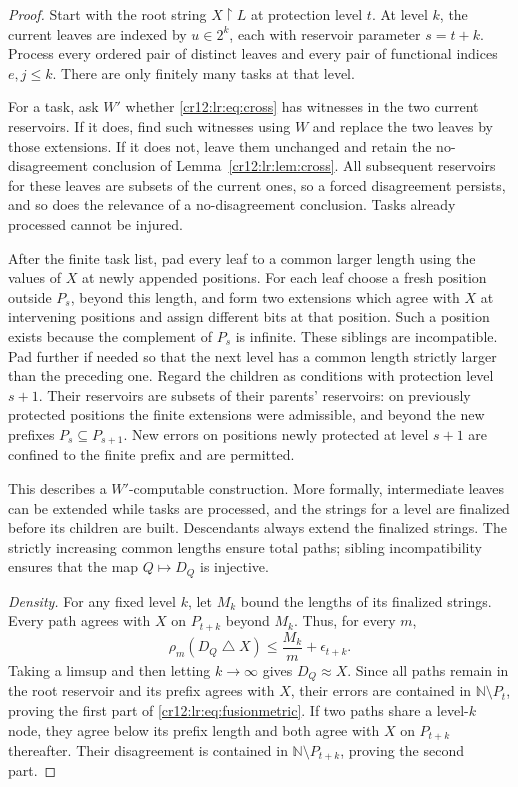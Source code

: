 \documentclass[11pt,letterpaper]{article}
\theoremstyle{plain}
\theoremstyle{definition}
\theoremstyle{remark}
\numberwithin{equation}{section}
\newcommand{\N}{\mathbb N}
\newcommand{\sd}{\mathbin{\triangle}}
\newcommand{\rest}{\mathbin{\upharpoonright}}
\begin{document}
\begin{proof}
Start with the root string $X\rest L$ at protection level $t$. At level $k$, the
current leaves are indexed by $u\in2^k$, each with reservoir parameter $s=t+k$.
Process every ordered pair of distinct leaves and every pair of functional indices
$e,j\leq k$. There are only finitely many tasks at that level.

For a task, ask $W'$ whether \eqref{cr12:lr:eq:cross} has witnesses in the two current
reservoirs. If it does, find such witnesses using $W$ and replace the two leaves by
those extensions. If it does not, leave them unchanged and retain the no-disagreement
conclusion of Lemma~\ref{cr12:lr:lem:cross}. All subsequent reservoirs for these
leaves are subsets of the current ones, so a forced disagreement persists, and so does
the relevance of a no-disagreement conclusion. Tasks already processed cannot be
injured.

After the finite task list, pad every leaf to a common larger length using the values
of $X$ at newly appended positions. For each leaf choose a fresh position outside
$P_s$, beyond this length, and form two extensions which agree with $X$ at intervening
positions and assign different bits at that position. Such a position exists because
the complement of $P_s$ is infinite. These siblings are incompatible. Pad further if
needed so that the next level has a common length strictly larger than the preceding
one. Regard the children as conditions with protection level $s+1$. Their reservoirs
are subsets of their parents' reservoirs: on previously protected positions the finite
extensions were admissible, and beyond the new prefixes $P_s\subseteq P_{s+1}$. New
errors on positions newly protected at level $s+1$ are confined to the finite prefix
and are permitted.

This describes a $W'$-computable construction. More formally, intermediate leaves can
be extended while tasks are processed, and the strings for a level are finalized
before its children are built. Descendants always extend the finalized strings. The
strictly increasing common lengths ensure total paths; sibling incompatibility ensures
that the map $Q\mapsto D_Q$ is injective.

\emph{Density.} For any fixed level $k$, let $M_k$ bound the lengths of its finalized
strings. Every path agrees with $X$ on $P_{t+k}$ beyond $M_k$. Thus, for every $m$,
\[
 \rho_m(D_Q\sd X)\leq\frac{M_k}{m}+\epsilon_{t+k}.
\]
Taking a limsup and then letting $k\to\infty$ gives $D_Q\approx X$. Since all paths
remain in the root reservoir and its prefix agrees with $X$, their errors are contained
in $\N\setminus P_t$, proving the first part of \eqref{cr12:lr:eq:fusionmetric}. If two
paths share a level-$k$ node, they agree below its prefix length and both agree with
$X$ on $P_{t+k}$ thereafter. Their disagreement is contained in
$\N\setminus P_{t+k}$, proving the second part.


\end{proof}
\end{document}
